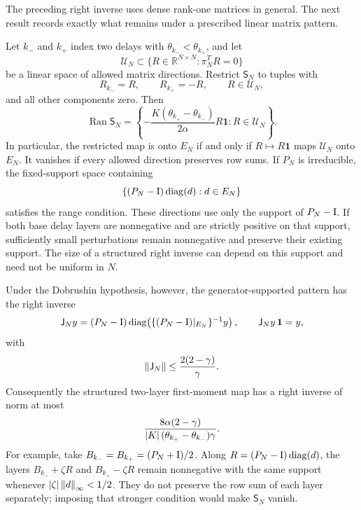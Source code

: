 The preceding right inverse uses dense rank-one matrices in general.  The
next result records exactly what remains under a prescribed linear matrix
pattern.

\begin{theorem}
\label{thm:rw-structured-delay-range}
Let \(k_-\) and \(k_+\) index two delays with
\(\theta_{k_-}<\theta_{k_+}\), and let
\[
 \mathcal U_N\subset
 \{R\in\mathbb R^{N\times N}:\pi_N^TR=0\}
\]
be a linear space of allowed matrix directions.  Restrict
\(\mathsf S_N\) to tuples with
\[
 R_{k_-}=R,\qquad R_{k_+}=-R,\qquad
 R\in\mathcal U_N,
\]
and all other components zero.  Then
\begin{equation}
 \operatorname{Ran}\mathsf S_N
 =\left\{-\frac{K(\theta_{k_+}-\theta_{k_-})}{2\alpha}
           R\mathbf1:R\in\mathcal U_N\right\}.        \label{eq:rw-structured-range}
\end{equation}
In particular, the restricted map is onto \(E_N\) if and only if
\(R\mapsto R\mathbf1\) maps \(\mathcal U_N\) onto \(E_N\).  It vanishes if
every allowed direction preserves row sums.  If \(P_N\) is irreducible, the
fixed-support space containing
\[
 \{(P_N-\mathrm I)\operatorname{diag}(d):d\in E_N\}
\]
satisfies the range condition.  These directions use only the support of
\(P_N-\mathrm I\).  If both base delay layers are nonnegative and are strictly
positive on that support, sufficiently small perturbations remain
nonnegative and preserve their existing support.  The size of a structured
right inverse can depend on this support and need not be uniform in \(N\).

Under the Dobrushin hypothesis, however, the generator-supported pattern has
the right inverse
\begin{equation}
 \mathsf J_Ny=(P_N-\mathrm I)\operatorname{diag}\!\left(
       \{(P_N-\mathrm I)|_{E_N}\}^{-1}y\right),
 \qquad \mathsf J_Ny\,\mathbf1=y,                    \label{eq:rw-generator-right-inverse}
\end{equation}
with
\begin{equation}
 \left\lVert\mathsf J_N\right\rVert\le\frac{2(2-\gamma)}{\gamma}.
 \label{eq:rw-generator-right-inverse-bound}
\end{equation}
Consequently the structured two-layer first-moment map has a right inverse
of norm at most
\begin{equation}
 \frac{8\alpha(2-\gamma)}
      {\left\lvert K\right\rvert(\theta_{k_+}-\theta_{k_-})\gamma}.      \label{eq:rw-structured-source-inverse-bound}
\end{equation}
For example, take
\(B_{k_-}=B_{k_+}=(P_N+\mathrm I)/2\).  Along
\(R=(P_N-\mathrm I)\operatorname{diag}(d)\), the layers
\(B_{k_-}+\zeta R\) and \(B_{k_+}-\zeta R\) remain nonnegative with the same
support whenever \(\left\lvert\zeta\right\rvert\left\lVert d\right\rVert_\infty<1/2\).  They do not preserve the
row sum of each layer separately; imposing that stronger condition would
make \(\mathsf S_N\) vanish.
\end{theorem}

